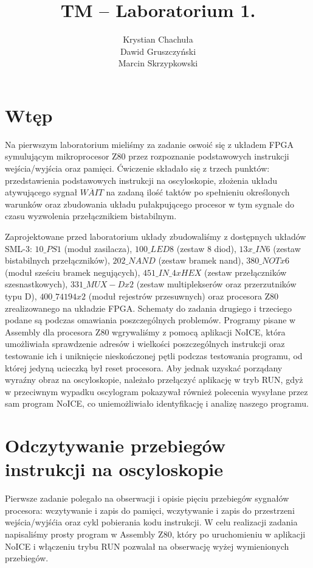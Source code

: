 \documentclass[fleqn]{article}
\title{TM -- Laboratorium 1.}
\author{Krystian Chachuła \\ Dawid Gruszczyński \\ Marcin Skrzypkowski}
\begin{document}
\maketitle

\setcounter{page}{0}
\thispagestyle{empty}

\pagebreak

\setcounter{page}{1}

\section{Wtęp}

Na pierwszym laboratorium mieliśmy za zadanie oswoić się z układem FPGA symulującym mikroprocesor Z80 przez rozpoznanie podstawowych instrukcji wejścia/wyjścia oraz pamięci. Ćwiczenie składało się z trzech punktów: przedstawienia podstawowych instrukcji na oscyloskopie, złożenia układu atywującego sygnał $\overline{WAIT}$ na zadaną ilość taktów po spełnieniu określonych warunków oraz zbudowania układu pułakpującego procesor w tym sygnale do czasu wyzwolenia przełącznikiem bistabilnym.

Zaprojektowane przed laboratorium układy zbudowaliśmy z dostępnych układów SML-3: ${10\_PS1}$ (moduł zasilacza), ${100\_LED8}$ (zestaw 8 diod), ${13x\_IN6}$ (zestaw bistabilnych przełączników), ${202\_NAND}$ (zestaw bramek nand), ${380\_NOTx6}$ (moduł sześciu bramek negujących), ${451\_IN\_4xHEX}$ (zestaw przełączników szesnastkowych), ${331\_MUX-Dx2}$ (zestaw multiplekserów oraz przerzutników typu D), ${400\_74194x2}$ (moduł rejestrów przesuwnych) oraz procesora Z80 zrealizowanego na układzie FPGA.
Schematy do zadania drugiego i trzeciego podane są podczas omawiania poszczególnych problemów. Programy pisane w Assembly dla procesora Z80 wgrywaliśmy z pomocą aplikacji NoICE, która umożliwiała sprawdzenie adresów i wielkości poszczególnych instrukcji oraz testowanie ich i uniknięcie nieskończonej pętli podczas testowania programu, od której jedyną ucieczką był reset procesora. Aby jednak uzyskać porządany wyraźny obraz na oscyloskopie, należało przełączyć aplikację w tryb RUN, gdyż w przeciwnym wypadku oscylogram pokazywał również polecenia wysyłane przez sam program NoICE, co uniemożliwiało identyfikację i analizę naszego programu.



\section{Odczytywanie przebiegów instrukcji na oscyloskopie}
Pierwsze zadanie polegało na obserwacji i opisie pięciu przebiegów sygnałów procesora: wczytywanie i zapis do pamięci, wczytywanie i zapis do przestrzeni wejścia/wyjśćia oraz cykl pobierania kodu instrukcji.
W celu realizacji zadania napisaliśmy prosty program w Assembly Z80, który po uruchomieniu w aplikacji NoICE i włączeniu trybu RUN pozwalał na obserwację wyżej wymienionych przebiegów.
\end{document}
